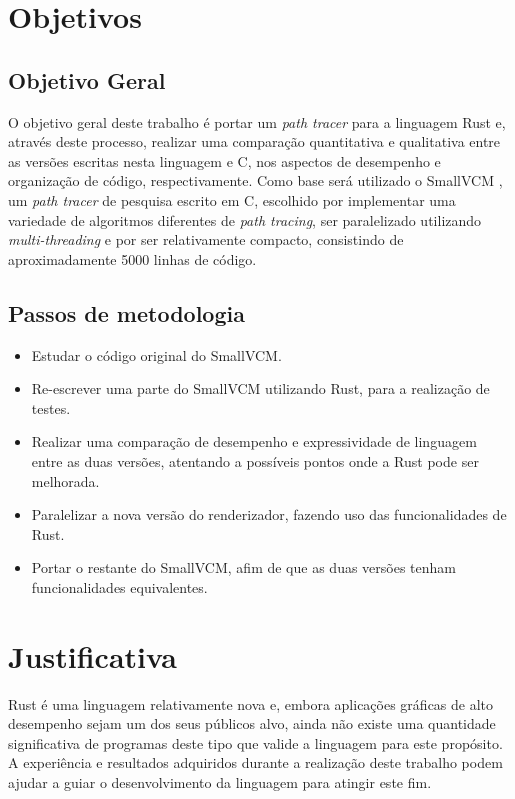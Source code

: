 \documentclass[tg]{mdtufsm}
\def\Cpp{{C\nolinebreak[4]\raisebox{.20ex}{\small\bf++}}}
\newcommand{\todo}[1]{\textsf{\color{red}#1}}
\begin{document}
\section{Objetivos}

\subsection{Objetivo Geral}

O objetivo geral deste trabalho é portar um \emph{path tracer} para a linguagem Rust e, através deste processo,
realizar uma comparação quantitativa e qualitativa entre as versões escritas nesta linguagem e \Cpp, nos aspectos de
desempenho e organização de código, respectivamente. Como base será utilizado o SmallVCM \citep{smallvcm}, um
\emph{path tracer} de pesquisa escrito em \Cpp, escolhido por implementar uma variedade
de algoritmos diferentes de \emph{path tracing}, ser paralelizado utilizando \emph{multi-threading} e por ser relativamente compacto, consistindo de
aproximadamente 5000 linhas de código.

\subsection{Passos de metodologia}
\begin{itemize}
	\item Estudar o código original do SmallVCM.
	\item Re-escrever uma parte do SmallVCM utilizando Rust, para a realização de
		testes.
	\item Realizar uma comparação de desempenho \todo{e expressividade de linguagem} entre as duas versões,
		atentando a possíveis pontos onde a Rust pode ser melhorada.
	\item Paralelizar a nova versão do renderizador, fazendo uso das funcionalidades de Rust.
	\item Portar o restante do SmallVCM, afim de que as duas versões tenham funcionalidades
		equivalentes.
\end{itemize}

\section{Justificativa}

Rust é uma linguagem relativamente nova e, embora aplicações gráficas de alto desempenho sejam um
dos seus públicos alvo, ainda não existe uma quantidade significativa de programas deste tipo que
valide a linguagem para este propósito. A experiência e resultados adquiridos durante a realização
deste trabalho podem ajudar a guiar o desenvolvimento da linguagem para atingir este fim.
\end{document}
